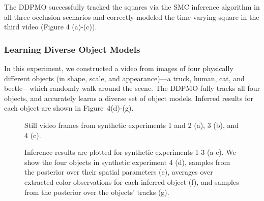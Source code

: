 \documentclass{article}
\begin{document}
The DDPMO successfully tracked the squares via the SMC inference algorithm in all three occlusion scenarios and correctly modeled the time-varying square in the third video (Figure 4 (a)-(c)).

\subsubsection{Learning Diverse Object Models}
In this experiment, we constructed a video from images of four physically different objects (in shape, scale, and appearance)---a truck, human, cat, and beetle---which randomly walk around the scene. The DDPMO fully tracks all four objects, and accurately learns a diverse set of object models. Inferred results for each object are shown in Figure~4(d)-(g).

\begin{figure}[h!tbp]
        \caption{\label{fig:synthVidFig} Still video frames from synthetic experiments 1 and 2 (a), 3 (b), and 4 (c).}
\end{figure}


\begin{figure}[h!tbp]
        \caption{\label{fig:synthVidFig} Inference results are plotted for synthetic experiments 1-3 (a-c). We show the four objects in synthetic experiment 4 (d), samples from the posterior over their spatial parameters (e), averages over extracted color observations for each inferred object (f), and samples from the posterior over the objects' tracks (g).}
\end{figure}
\end{document}
